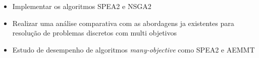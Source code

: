 \documentclass[]{article}
\begin{document}
	\begin{itemize}
		\item Implementar os algoritmos SPEA2 e NSGA2
		\item Realizar uma análise comparativa com as abordagens ja existentes para resolução de problemas discretos com multi objetivos
		\item Estudo de desempenho de algoritmos \textit{many-objective} como SPEA2 e AEMMT
	\end{itemize}

\newpage


\end{document}
